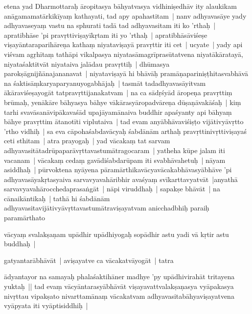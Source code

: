 \documentclass[article,12pt,a4paper]{memoir}%
\newcommand{\persName}[1]{#1}
\newcounter{parCount}
\begin{document}
	  \pstart \leavevmode%
	\label{thakur75-65.24}etena yad \persName{Dharmottaraḥ} āropitasya bāhyatvasya vidhiniṣedhāv ity alaukikam anāgamamatārkikīyaṃ kathayati, tad apy apahastitam | \label{thakur75-65.26} nanv adhyavasāye yady adhyavaseyaṃ vastu na sphurati tadā tad adhyavasitam iti ko 'rthaḥ | apratibhāse 'pi pravṛttiviṣayīkṛtam iti yo 'rthaḥ | apratibhāsāviśeṣe viṣayāntaraparihāreṇa kathaṃ niyataviṣayā pravṛttir iti cet | ucyate | yady api viśvam agṛhītaṃ tathāpi vikalpasya niyatasāmagrīprasūtatvena niyatākāratayā, niyataśaktitvāt niyataiva jalādau pravṛttiḥ | dhūmasya parokṣāgnijñānajananavat | \label{thakur75-66.1} niyataviṣayā hi bhāvāḥ pramāṇapariniṣṭhitasvabhāvā na śaktisāṃkaryaparyanuyogabhājaḥ | tasmāt tadadhyavasāyitvam ākāraviśeṣayogāt tatpravṛttijanakatvam | na ca sādṛśyād āropeṇa pravṛttiṃ brūmaḥ, yenākāre bāhyasya bāhye vākārasyāropadvāreṇa dūṣaṇāvakāśaḥ | kiṃ tarhi svavāsanāvipākavaśād upajāyamānaiva buddhir apaśyanty api bāhyaṃ bāhye pravṛttim ātanotīti viplutaiva | tad evam anyābhāvaviśiṣṭo vijātivyāvṛtto 'rtho vidhiḥ | sa eva cāpohaśabdavācyaḥ śabdānām arthaḥ pravṛttinivṛttiviṣayaś ceti sthitam | \label{thakur75-66.8} atra prayogaḥ | yad vācakaṃ tat sarvam adhyavasitātadrūpaparāvṛttavastumātragocaram | yatheha kūpe jalam iti vacanam | vācakaṃ cedaṃ gavādiśabdarūpam iti svabhāvahetuḥ | nāyam asiddhaḥ | pūrvoktena nyāyena pāramārthikavācyavācakabhāvasyābhāve 'pi adhyavasāyakṛtasyaiva sarvavyavahāribhir avaśyaṃ svīkarttavyatvāt |anyathā sarvavyavahārocchedaprasaṅgāt | nāpi viruddhaḥ | sapakṣe bhāvāt | na cānaikāntikaḥ | tathā hi śabdānām adhyavasitavijātivyāvṛttavastumātraviṣayatvam anicchadbhiḥ paraiḥ paramārthato
	{}
	\pend%
      

	  \pstart \leavevmode%
	vācyaṃ svalakṣaṇam upādhir upādhiyogaḥ sopādhir astu yadi vā kṛtir astu buddhaḥ |
	{}
	\pend%
      

	  \pstart \leavevmode%
	gatyantarābhāvāt | aviṣayatve ca vācakatvāyogāt | tatra
	{}
	\pend%
      

	  \pstart \leavevmode%
	ādyantayor na samayaḥ phalaśaktihāner madhye 'py upādhivirahāt tritayena yuktaḥ || \label{thakur75-66.19} tad evaṃ vācyāntarasyābhāvāt viṣayavattvalakṣaṇasya vyāpakasya nivṛttau vipakṣato nivarttamānaṃ vācakatvam adhyavasitabāhyaviṣayatvena vyāpyata iti vyāptisiddhiḥ |
	{}
	\pend%
      
\end{document}
